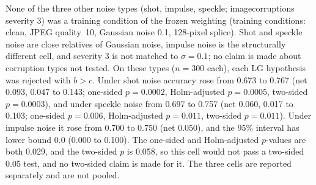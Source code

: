 None of the three other noise types (shot, impulse, speckle; imagecorruptions severity 3) was a training condition of the frozen
weighting (training conditions: clean, JPEG quality~10, Gaussian noise 0.1, 128-pixel splice).
Shot and speckle noise are close relatives of Gaussian noise, impulse noise is the structurally different cell, and severity 3 is not
matched to $\sigma=0.1$; no claim is made about corruption types not tested.
On these types ($n=300$ each), each LG hypothesis was rejected with $b>c$.
Under shot noise accuracy rose from 0.673 to 0.767 (net 0.093, 0.047 to 0.143; one-sided $p=0.0002$, Holm-adjusted $p=0.0005$, two-sided
$p=0.0003$), and under speckle noise from 0.697 to 0.757 (net 0.060, 0.017 to 0.103; one-sided $p=0.006$, Holm-adjusted $p=0.011$, two-sided $p=0.011$).
Under impulse noise it rose from 0.700 to 0.750 (net 0.050), and the 95\% interval has lower bound 0.0 (0.000 to 0.100).
The one-sided and Holm-adjusted $p$-values are both 0.029, and the two-sided $p$ is 0.058, so this cell would not pass a two-sided 0.05 test, and no
two-sided claim is made for it.
The three cells are reported separately and are not pooled.

